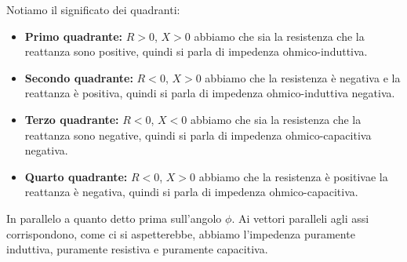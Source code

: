 \documentclass[a4paper,11pt]{article}
\begin{document}
Notiamo il significato dei quadranti: 
\begin{itemize}
	\item \textbf{Primo quadrante:} $R > 0$, $X > 0$ abbiamo che sia la resistenza che la reattanza sono positive, quindi si parla di impedenza ohmico-induttiva.
	\item \textbf{Secondo quadrante:} $R < 0$, $X > 0$ abbiamo che la resistenza è negativa e la reattanza è positiva, quindi si parla di impedenza ohmico-induttiva negativa.
	\item \textbf{Terzo quadrante:} $R < 0$, $X < 0$ abbiamo che sia la resistenza che la reattanza sono negative, quindi si parla di impedenza ohmico-capacitiva negativa.
	\item \textbf{Quarto quadrante:} $R < 0$, $X > 0$ abbiamo che la resistenza è positivae la reattanza è negativa, quindi si parla di impedenza ohmico-capacitiva.
\end{itemize}

In parallelo a quanto detto prima sull'angolo $\phi$.
Ai vettori paralleli agli assi corrispondono, come ci si aspetterebbe, abbiamo l'impedenza puramente induttiva, puramente resistiva e puramente capacitiva.
\end{document}
